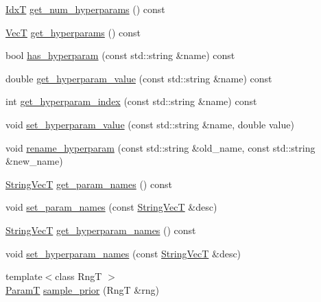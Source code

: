 \begin{DoxyCompactItemize}
\item 
\hyperlink{namespacemappel_ab17ec0f30b61ece292439d7ece81d3a8}{IdxT} \hyperlink{classmappel_1_1PointEmitterModel_a442522cdaaa76be15b00a4f25110d7ec}{get\+\_\+num\+\_\+hyperparams} () const 
\item 
\hyperlink{namespacemappel_a2225ad69f358daa3f4f99282a35b9a3a}{VecT} \hyperlink{classmappel_1_1PointEmitterModel_a4085ade54f4b039c647bc9bf7804e007}{get\+\_\+hyperparams} () const 
\item 
bool \hyperlink{classmappel_1_1PointEmitterModel_afba2b17a81a506b0acd41616c8604412}{has\+\_\+hyperparam} (const std\+::string \&name) const 
\item 
double \hyperlink{classmappel_1_1PointEmitterModel_a3282cc59d5c6010a51f671ba72997705}{get\+\_\+hyperparam\+\_\+value} (const std\+::string \&name) const 
\item 
int \hyperlink{classmappel_1_1PointEmitterModel_ae13aa99689266d870b659d1045d595f1}{get\+\_\+hyperparam\+\_\+index} (const std\+::string \&name) const 
\item 
void \hyperlink{classmappel_1_1PointEmitterModel_ade3e56cc00c43e9b7a521d8c4778d3b7}{set\+\_\+hyperparam\+\_\+value} (const std\+::string \&name, double value)
\item 
void \hyperlink{classmappel_1_1PointEmitterModel_a447c83f0769e6dea2bfad68d957287d0}{rename\+\_\+hyperparam} (const std\+::string \&old\+\_\+name, const std\+::string \&new\+\_\+name)
\item 
\hyperlink{namespacemappel_aae88cf18bccfbb789a6019bcfbbfca68}{String\+VecT} \hyperlink{classmappel_1_1PointEmitterModel_aa910d1137d808041c0601f2dd3db96f0}{get\+\_\+param\+\_\+names} () const 
\item 
void \hyperlink{classmappel_1_1PointEmitterModel_a2abccbca47fc60700d73244e6c4dbe30}{set\+\_\+param\+\_\+names} (const \hyperlink{namespacemappel_aae88cf18bccfbb789a6019bcfbbfca68}{String\+VecT} \&desc)
\item 
\hyperlink{namespacemappel_aae88cf18bccfbb789a6019bcfbbfca68}{String\+VecT} \hyperlink{classmappel_1_1PointEmitterModel_a1b8bbd4bdddfb8f5236e8e50fe546c36}{get\+\_\+hyperparam\+\_\+names} () const 
\item 
void \hyperlink{classmappel_1_1PointEmitterModel_a6cdba258bda50cff162dc16a49383bb0}{set\+\_\+hyperparam\+\_\+names} (const \hyperlink{namespacemappel_aae88cf18bccfbb789a6019bcfbbfca68}{String\+VecT} \&desc)
\item 
{\footnotesize template$<$class RngT $>$ }\\\hyperlink{classmappel_1_1PointEmitterModel_a665ec6aea3aac139bb69a23c06d4b9a1}{ParamT} \hyperlink{classmappel_1_1PointEmitterModel_a031ef6c978371ce3774dffe811060842}{sample\+\_\+prior} (RngT \&rng)

\end{DoxyCompactItemize}

